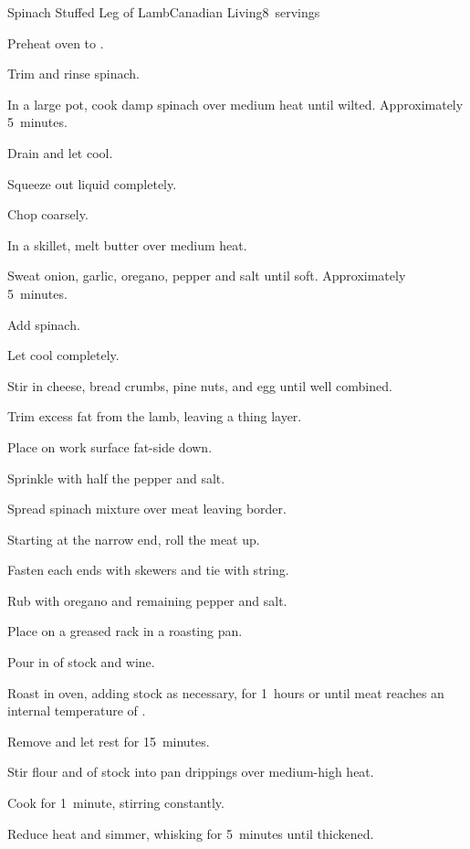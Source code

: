 \begin{recipe}{Spinach Stuffed Leg of Lamb}{Canadian Living}{8~servings}
\begin{directions}
\item Preheat oven to .
\item Trim and rinse spinach.
\item In a large pot, cook damp spinach over medium heat until wilted. Approximately 5~minutes.
\item Drain and let cool.
\item Squeeze out liquid completely.
\item Chop coarsely.
\item In a skillet, melt butter over medium heat.
\item Sweat onion, garlic, oregano, pepper and salt until soft. Approximately 5~minutes.
\item Add spinach.
\item Let cool completely.
\item Stir in cheese, bread crumbs, pine nuts, and egg until well combined.
\item Trim excess fat from the lamb, leaving a thing layer.
\item Place on work surface fat-side down.
\item Sprinkle with half the pepper and salt.
\item Spread spinach mixture over meat leaving  border.
\item Starting at the narrow end, roll the meat up.
\item Fasten each ends with skewers and tie with string.
\item Rub with oregano and remaining pepper and salt.
\item Place on a greased rack in a roasting pan.
\item Pour in  of stock and wine.
\item Roast in oven, adding stock as necessary, for 1\half~hours or until meat reaches an internal temperature of .
\item Remove and let rest for 15~minutes.
\item Stir flour and  of stock into pan drippings over medium-high heat.
\item Cook for 1~minute, stirring constantly.
\item Reduce heat and simmer, whisking for 5~minutes until thickened.
\end{directions}

\end{recipe}
